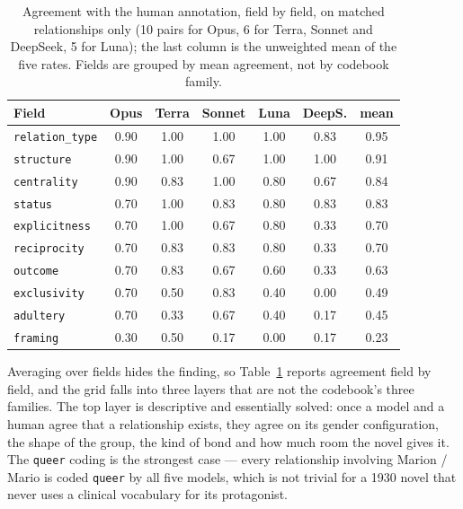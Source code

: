 \begin{table}[h]
  \centering
  \small
  \begin{tabular}{lcccccc}
    \toprule
    Field & Opus & Terra & Sonnet & Luna & DeepS. & mean \\
    \midrule
    \texttt{relation\_type} & 0.90 & 1.00 & 1.00 & 1.00 & 0.83 & 0.95 \\
    \texttt{structure}      & 0.90 & 1.00 & 0.67 & 1.00 & 1.00 & 0.91 \\
    \texttt{centrality}     & 0.90 & 0.83 & 1.00 & 0.80 & 0.67 & 0.84 \\
    \texttt{status}         & 0.70 & 1.00 & 0.83 & 0.80 & 0.83 & 0.83 \\
    \midrule
    \texttt{explicitness}   & 0.70 & 1.00 & 0.67 & 0.80 & 0.33 & 0.70 \\
    \texttt{reciprocity}    & 0.70 & 0.83 & 0.83 & 0.80 & 0.33 & 0.70 \\
    \texttt{outcome}        & 0.70 & 0.83 & 0.67 & 0.60 & 0.33 & 0.63 \\
    \midrule
    \texttt{exclusivity}    & 0.70 & 0.50 & 0.83 & 0.40 & 0.00 & 0.49 \\
    \texttt{adultery}       & 0.70 & 0.33 & 0.67 & 0.40 & 0.17 & 0.45 \\
    \texttt{framing}        & 0.30 & 0.50 & 0.17 & 0.00 & 0.17 & 0.23 \\
    \bottomrule
  \end{tabular}
  \caption{Agreement with the human annotation, field by field, on matched
  relationships only (10 pairs for Opus, 6 for Terra, Sonnet and DeepSeek, 5 for
  Luna); the last column is the unweighted mean of the five rates. Fields are
  grouped by mean agreement, not by codebook family.}
  \label{tab:field-results}
\end{table}

Averaging over fields hides the finding, so Table~\ref{tab:field-results}
reports agreement field by field, and the grid falls into three layers that are
not the codebook's three families. The top layer is descriptive and essentially
solved: once a model and a human agree that a relationship exists, they agree on
its gender configuration, the shape of the group, the kind of bond and how much
room the novel gives it. The \texttt{queer} coding is the strongest case --- every
relationship involving Marion / Mario is coded \texttt{queer} by all five models,
which is not trivial for a 1930 novel that never uses a clinical vocabulary for
its protagonist.

